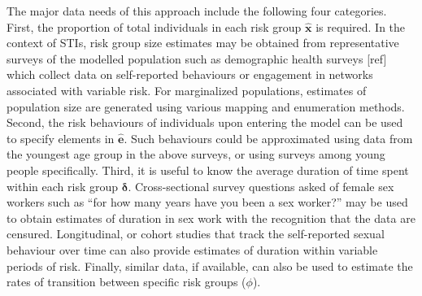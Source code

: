 \par %
The major data needs of this approach include the following four categories.			%
First, the proportion of total individuals in each risk group $\bm{\hat{x}}$ is required.	%
In the context of STIs, risk group size estimates may be 
obtained from representative surveys of the modelled population
such as demographic health surveys [ref] which collect data on self-reported behaviours or engagement in %
networks associated with variable risk. For marginalized populations, estimates of population size
are generated using various mapping and enumeration methods. %
Second, the risk behaviours of individuals upon entering the model		%
can be used to specify elements in $\bm{\hat{e}}$.
Such behaviours could be approximated using data from the youngest age group
in the above surveys,										%
or using surveys among young people specifically.					%
Third, it is useful to know the average duration of time spent within each risk group $\bm{\delta}$.	%
Cross-sectional survey questions asked of female sex workers such as	
``for how many years have you been a sex worker?''			
may be used to obtain estimates of duration in sex work \citep{Watts2010}
with the recognition that the data are censured. Longitudinal, or cohort studies
that track the self-reported sexual behaviour over time can also provide 
estimates of duration within variable periods of risk.					%
Finally, similar data, if available, can also be used to estimate
the rates of transition between specific risk groups ($\phi$).			%
